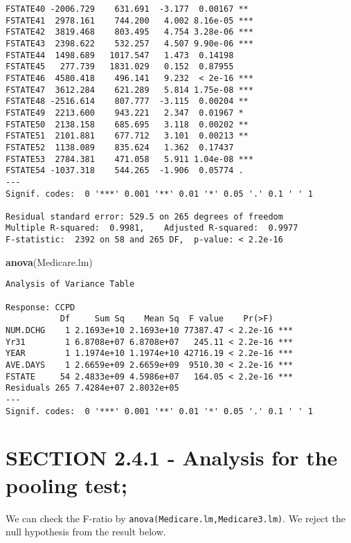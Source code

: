 \documentclass[]{book}
\newenvironment{Shaded}{\begin{snugshade}}{\end{snugshade}}
\newcommand{\KeywordTok}[1]{\textcolor[rgb]{0.13,0.29,0.53}{\textbf{#1}}}
\newcommand{\NormalTok}[1]{#1}
\begin{document}
\begin{verbatim}
FSTATE40 -2006.729    631.691  -3.177  0.00167 ** 
FSTATE41  2978.161    744.200   4.002 8.16e-05 ***
FSTATE42  3819.468    803.495   4.754 3.28e-06 ***
FSTATE43  2398.622    532.257   4.507 9.90e-06 ***
FSTATE44  1498.689   1017.547   1.473  0.14198    
FSTATE45   277.739   1831.029   0.152  0.87955    
FSTATE46  4580.418    496.141   9.232  < 2e-16 ***
FSTATE47  3612.284    621.289   5.814 1.75e-08 ***
FSTATE48 -2516.614    807.777  -3.115  0.00204 ** 
FSTATE49  2213.600    943.221   2.347  0.01967 *  
FSTATE50  2138.158    685.695   3.118  0.00202 ** 
FSTATE51  2101.881    677.712   3.101  0.00213 ** 
FSTATE52  1138.089    835.624   1.362  0.17437    
FSTATE53  2784.381    471.058   5.911 1.04e-08 ***
FSTATE54 -1037.318    544.265  -1.906  0.05774 .  
---
Signif. codes:  0 '***' 0.001 '**' 0.01 '*' 0.05 '.' 0.1 ' ' 1

Residual standard error: 529.5 on 265 degrees of freedom
Multiple R-squared:  0.9981,    Adjusted R-squared:  0.9977 
F-statistic:  2392 on 58 and 265 DF,  p-value: < 2.2e-16
\end{verbatim}

\begin{Shaded}
\begin{Highlighting}[]
\KeywordTok{anova}\NormalTok{(Medicare.lm)}
\end{Highlighting}
\end{Shaded}

\begin{verbatim}
Analysis of Variance Table

Response: CCPD
           Df     Sum Sq    Mean Sq  F value    Pr(>F)    
NUM.DCHG    1 2.1693e+10 2.1693e+10 77387.47 < 2.2e-16 ***
Yr31        1 6.8708e+07 6.8708e+07   245.11 < 2.2e-16 ***
YEAR        1 1.1974e+10 1.1974e+10 42716.19 < 2.2e-16 ***
AVE.DAYS    1 2.6659e+09 2.6659e+09  9510.30 < 2.2e-16 ***
FSTATE     54 2.4833e+09 4.5986e+07   164.05 < 2.2e-16 ***
Residuals 265 7.4284e+07 2.8032e+05                       
---
Signif. codes:  0 '***' 0.001 '**' 0.01 '*' 0.05 '.' 0.1 ' ' 1
\end{verbatim}

\hypertarget{section-2.4.1---analysis-for-the-pooling-test}{%
\section{SECTION 2.4.1 - Analysis for the pooling test;}\label{section-2.4.1---analysis-for-the-pooling-test}}

We can check the F-ratio by \texttt{anova(Medicare.lm,Medicare3.lm)}. We reject the null hypothesis from the result below.
\end{document}
